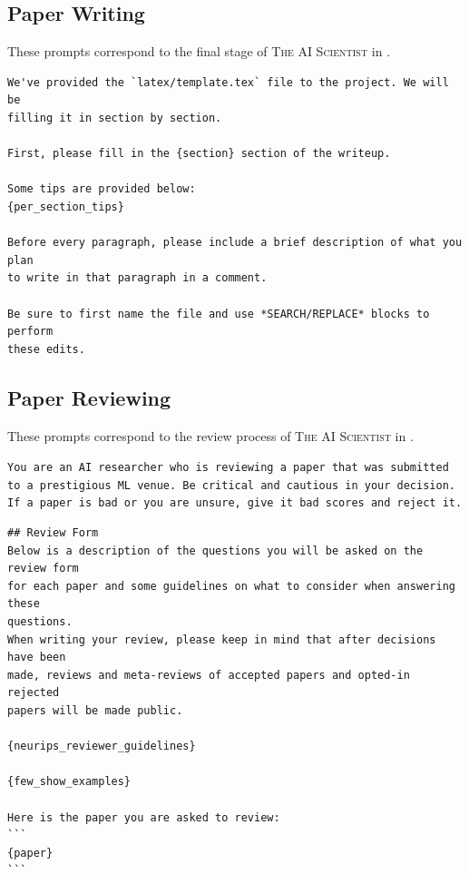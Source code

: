 \documentclass[11pt, a4paper]{include/gdm_format}
\newcommand{\ouralgo}{\textsc{The AI Scientist}\xspace}
\begin{document}
\subsection{Paper Writing}
\label{appsubsec:paperwriting_prompts}

These prompts correspond to the final stage of \ouralgo in .

\begin{tcolorbox}[breakable, colback=orange!5!white, colframe=orange!80!black, title=Paper Writing Aider Prompt]
\small
\begin{verbatim}
We've provided the `latex/template.tex` file to the project. We will be
filling it in section by section.

First, please fill in the {section} section of the writeup.

Some tips are provided below:
{per_section_tips}

Before every paragraph, please include a brief description of what you plan
to write in that paragraph in a comment.

Be sure to first name the file and use *SEARCH/REPLACE* blocks to perform
these edits.
\end{verbatim}
\end{tcolorbox}

\subsection{Paper Reviewing}
\label{appsubsec:review_prompts}

These prompts correspond to the review process of \ouralgo in .

\begin{tcolorbox}[breakable,colback=orange!5!white, colframe=orange!80!black, title=Paper Review System Prompt]
\texttt{You are an AI researcher who is reviewing a paper that was submitted to a prestigious ML venue. Be critical and cautious in your decision. If a paper is bad or you are unsure, give it bad scores and reject it.}
\end{tcolorbox}


\begin{tcolorbox}[breakable, colback=orange!5!white, colframe=orange!80!black, title=Paper Review Prompt]
\small
\begin{verbatim}
## Review Form
Below is a description of the questions you will be asked on the review form
for each paper and some guidelines on what to consider when answering these
questions.
When writing your review, please keep in mind that after decisions have been
made, reviews and meta-reviews of accepted papers and opted-in rejected
papers will be made public. 

{neurips_reviewer_guidelines}

{few_show_examples}

Here is the paper you are asked to review:
```
{paper}
```
\end{verbatim}
\end{tcolorbox}
\end{document}
